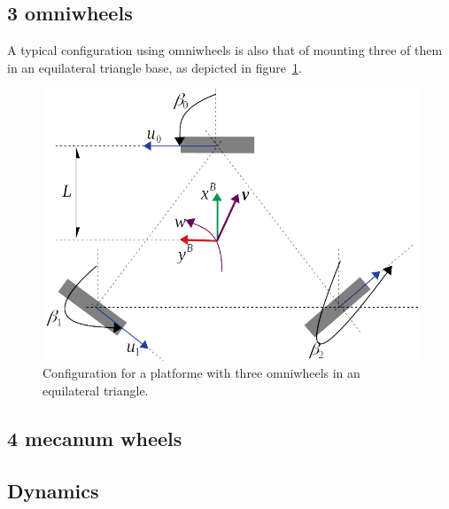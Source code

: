 \subsection{3 omniwheels}
A typical configuration using omniwheels is also that of mounting three of them in an equilateral triangle base, as depicted in figure~\ref{fig:three_omniwheels_kinematics}.
\begin{figure}[bth!]
  \begin{center}
    \includegraphics[width=1.0\columnwidth]{figures/three_omniwheels_kinematics.png}
    \caption{Configuration for a platforme with three omniwheels in an equilateral triangle.}
    \label{fig:three_omniwheels_kinematics}
  \end{center}
\end{figure}


\subsection{4 mecanum wheels}


\subsection{Dynamics}


